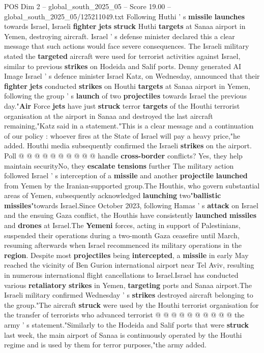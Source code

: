 \begin{textsample}{POS Dim 2 – global\_south\_2025\_05 – Score 19.00 – global\_south\_2025\_05/125211049.txt}  \label{ex:f2_pos_293}
Following Huthi ' s \textbf{missile} \textbf{launches} towards Israel, Israeli \textbf{fighter} \textbf{jets} \textbf{struck} Huthi \textbf{targets} at Sanaa airport in Yemen, destroying aircraft.
Israel ' s defense minister declared this a clear message that such actions would face severe consequences.
The Israeli military stated the \textbf{targeted} aircraft were used for terrorist activities against Israel, similar to previous \textbf{strikes} on Hodeida and Salif ports.
Denny generated AI Image Israel ' s defence minister Israel Katz, on Wednesday, announced that their \textbf{fighter} \textbf{jets} conducted \textbf{strikes} on Houthi \textbf{targets} at Sanaa airport in Yemen, following the group ' s \textbf{launch} of two \textbf{projectiles} towards Israel the previous day."\textbf{Air} Force \textbf{jets} have just \textbf{struck} terror \textbf{targets} of the Houthi terrorist organisation at the airport in Sanaa and destroyed the last aircraft remaining,"Katz said in a statement."This is a clear message and a continuation of our policy : whoever fires at the State of Israel will pay a heavy price,"he added.
Houthi media subsequently confirmed the Israeli \textbf{strikes} on the airport.
Poll @ @ @ @ @ @ @ @ @ @ handle \textbf{cross-border} conflicts?
Yes, they help maintain securityNo, they \textbf{escalate} \textbf{tensions} further The military action followed Israel ' s interception of a \textbf{missile} and another \textbf{projectile} \textbf{launched} from Yemen by the Iranian-supported group.The Houthis, who govern substantial areas of Yemen, subsequently acknowledged \textbf{launching} two"\textbf{ballistic} \textbf{missiles}"towards Israel.Since October 2023, following Hamas ' s \textbf{attack} on Israel and the ensuing Gaza conflict, the Houthis have consistently \textbf{launched} \textbf{missiles} and \textbf{drones} at Israel.The \textbf{Yemeni} forces, acting in support of Palestinians, suspended their operations during a two-month Gaza ceasefire until March, resuming afterwards when Israel recommenced its military operations in the \textbf{region}.
Despite most \textbf{projectiles} being \textbf{intercepted}, a \textbf{missile} in early May reached the vicinity of Ben Gurion international airport near Tel Aviv, resulting in numerous international flight cancellations to Israel.Israel has conducted various \textbf{retaliatory} \textbf{strikes} in Yemen, \textbf{targeting} ports and Sanaa airport.The Israeli military confirmed Wednesday ' s \textbf{strikes} destroyed aircraft belonging to the group."The aircraft \textbf{struck} were used by the Houthi terrorist organisation for the transfer of terrorists who advanced terrorist @ @ @ @ @ @ @ @ @ @ the army ' s statement."Similarly to the Hodeida and Salif ports that were \textbf{struck} last week, the main airport of Sanaa is continuously operated by the Houthi regime and is used by them for terror purposes,"the army added.

\end{textsample}
